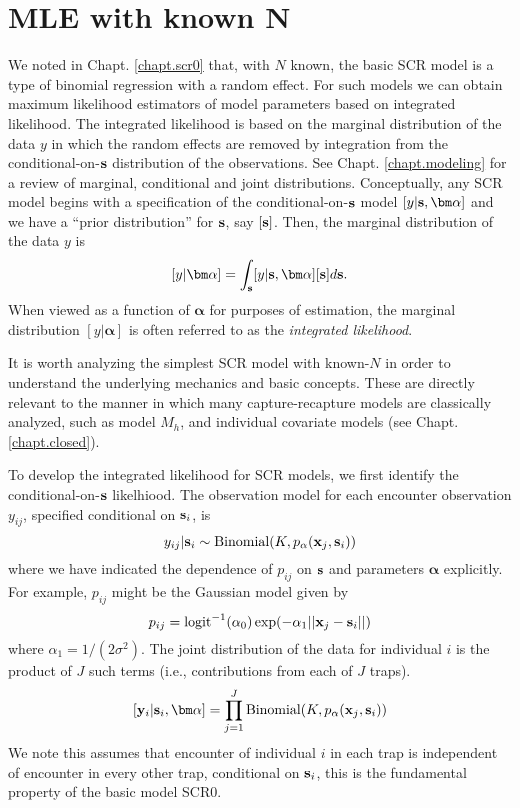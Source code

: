 \section{MLE with known N}

We noted in Chapt. \ref{chapt.scr0} that, with $N$ known, the basic SCR model is a
type of binomial regression with a random effect. For such models we
can  obtain maximum likelihood estimators of model parameters
based on integrated likelihood. The integrated likelihood is based on
the marginal distribution of the data $y$ in which the random effects
are removed by integration from the conditional-on-${\bf s}$ distribution of the
observations. See Chapt. \ref{chapt.modeling} for a
review of marginal, conditional and joint distributions.
Conceptually, any SCR model begins with a specification
of the conditional-on-${\bf s}$ model $[y|{\bf s},{\bm \alpha}]$ and we have
a ``prior distribution'' for ${\bf s}$, say $[{\bf s}]$. Then, the
marginal distribution of the data $y$ is
\[
[y|{\bm \alpha}] =  \int_{\bf s} [y|{\bf s},{\bm \alpha}][{\bf s}] d{\bf s}.
\]
When viewed as a function of ${\bm \alpha}$ for purposes of estimation, the
marginal distribution $[y|{\bm \alpha}]$ is often referred to as the {\it
  integrated likelihood}.

It is worth analyzing 
the simplest SCR model with known-$N$ in order to understand the
underlying mechanics and basic concepts. These are directly relevant to
the manner in which many capture-recapture models are classically
analyzed, such as model $M_h$, and individual covariate models (see
Chapt. \ref{chapt.closed}).

 To develop the integrated
likelihood for SCR models, we first identify the conditional-on-${\bf s}$
likelhiood. 
The observation model for each encounter observation $y_{ij}$,
specified conditional on ${\bf s}_{i}$, is 
\begin{equation}
y_{ij}| {\bf s}_{i} \sim \mbox{Binomial}(K, p_{\alpha}({\bf x}_{j},{\bf s}_{i}))
\label{mle.eq.cond-on-s}
\end{equation}
where we have indicated the dependence of $p_{ij}$ on ${\bf s}$ and
parameters ${\bm \alpha}$
explicitly. For example, $p_{ij}$ might be the Gaussian model given by
\[
 p_{ij} = \mbox{logit}^{-1}(\alpha_{0})\exp( -\alpha_{1} ||{\bf x}_{j} - {\bf s}_{i}||)
\]
where $\alpha_{1} = 1/(2\sigma^2)$.
The joint distribution of the data for individual $i$ is the product
of $J$ such terms (i.e., contributions from each of $J$ traps).
\[
  [{\bf y}_{i} | {\bf s}_{i} , {\bm \alpha}] = 
  \prod_{j=1}^{J} \mbox{Binomial}(K, p_{\alpha}({\bf x}_{j},{\bf s}_{i}) )
\]
We note this assumes that encounter of individual $i$ in each
trap is independent of encounter in every other trap, conditional on
${\bf s}_{i}$, this is the fundamental property of the basic model SCR0.


